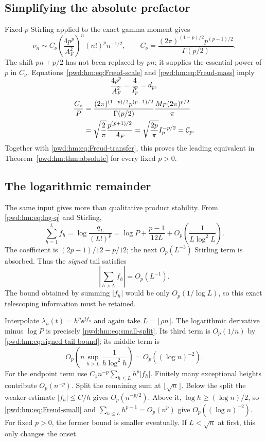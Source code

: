 \documentclass[11pt,letterpaper]{article}
\numberwithin{equation}{section}
\theoremstyle{remark}\newtheorem{remark}[theorem]{Remark}
\begin{document}
\subsection{Simplifying the absolute prefactor}
Fixed-$p$ Stirling applied to the exact gamma moment gives
\begin{equation}\label{pwd:hm:eq:nu-asymptotic}
 \nu_n\sim C_\nu\left(\frac{4p^p}{A_F^2}\right)^n(n!)^pn^{-1/2},\qquad
 C_\nu=\frac{(2\pi)^{(1-p)/2}p^{(p-1)/2}}{\Gamma(p/2)}.
\end{equation}
The shift $pn+p/2$ has not been replaced by $pn$; it supplies the essential power of $p$ in $C_\nu$. Equations~\eqref{pwd:hm:eq:Freud-scale} and \eqref{pwd:hm:eq:Freud-mass} imply
\[
 \frac{4p^p}{A_F^2}=\frac4{I_p^p}=d_p,
\]
\begin{align}\label{pwd:hm:eq:Freud-amplitude}
 \frac{C_\nu}{P}
 &=\frac{(2\pi)^{(1-p)/2}p^{(p-1)/2}}{\Gamma(p/2)}
   \frac{M_F(2\pi)^{p/2}}\pi\notag\\
 &=\sqrt{\frac2\pi}\frac{p^{(p+1)/2}}{A_F}
 =\sqrt{\frac{2p}{\pi}}I_p^{-p/2}=\mathcal{C}_p.
\end{align}
Together with \eqref{pwd:hm:eq:Freud-transfer}, this proves the leading equivalent in Theorem~\ref{pwd:hm:thm:absolute} for every fixed $p>0$.

\subsection{The logarithmic remainder}
The same input gives more than qualitative product stability. From \eqref{pwd:hm:eq:log-q} and Stirling,
\begin{equation}\label{pwd:hm:eq:Freud-signed-tail}
 \sum_{h=1}^Lf_h=\log\frac{q_L}{(L!)^p}
 =\log P+\frac{p-1}{12L}
 +O_p\left(\frac1{L\log^2L}\right).
\end{equation}
The coefficient is $(2p-1)/12-p/12$; the next $O_p(L^{-3})$ Stirling term is absorbed. Thus the \emph{signed} tail satisfies
\begin{equation}\label{pwd:hm:eq:signed-tail-bound}
 \left|\sum_{h>L}f_h\right|=O_p(L^{-1}).
\end{equation}
The bound obtained by summing $|f_h|$ would be only $O_p(1/\log L)$, so this exact telescoping information must be retained.

Interpolate $\lambda_h(t)=h^p\ee^{tf_h}$ and again take $L=\lfloor\rho n\rfloor$. The logarithmic derivative minus $\log P$ is precisely \eqref{pwd:hm:eq:small-split}. Its third term is $O_p(1/n)$ by \eqref{pwd:hm:eq:signed-tail-bound}; its middle term is
\[
 O_p\left(n\sup_{h>L}\frac1{h\log^2h}\right)=O_p((\log n)^{-2}).
\]
For the endpoint term use
$C_1n^{-p}\sum_{h\le L}h^p|f_h|$. Finitely many exceptional heights contribute $O_p(n^{-p})$. Split the remaining sum at $\lfloor\sqrt n\rfloor$. Below the split the weaker estimate $|f_h|\le C/h$ gives $O_p(n^{-p/2})$. Above it, $\log h\ge(\log n)/2$, so \eqref{pwd:hm:eq:Freud-small} and $\sum_{h\le L}h^{p-1}=O_p(n^p)$ give $O_p((\log n)^{-2})$. For fixed $p>0$, the former bound is smaller eventually. If $L<\sqrt n$ at first, this only changes the onset.
\end{document}
